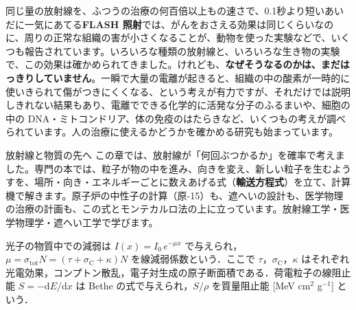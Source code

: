 \begin{phmada}
同じ量の放射線を、ふつうの治療の何百倍以上もの速さで、0.1秒より短いあいだに一気にあてる\textbf{FLASH 照射}では、がんをおさえる効果は同じくらいなのに、周りの正常な組織の害が小さくなることが、動物を使った実験などで、いくつも報告されています。いろいろな種類の放射線と、いろいろな生き物の実験で、この効果は確かめられてきました。けれども、\textbf{なぜそうなるのかは、まだはっきりしていません}。一瞬で大量の電離が起きると、組織の中の酸素が一時的に使いきられて傷がつきにくくなる、という考えが有力ですが、それだけでは説明しきれない結果もあり、電離でできる化学的に活発な分子のふるまいや、細胞の中の DNA・ミトコンドリア、体の免疫のはたらきなど、いくつもの考えが調べられています。人の治療に使えるかどうかを確かめる研究も始まっています。
\end{phmada}

\begin{phsaki}{放射線と物質の先へ}
この章では、放射線が「何回ぶつかるか」を確率で考えました。専門の本では、粒子が物の中を進み、向きを変え、新しい粒子を生むようすを、場所・向き・エネルギーごとに数えあげる式（\textbf{輸送方程式}）を立て、計算機で解きます。原子炉の中性子の計算（原-15）も、遮へいの設計も、医学物理の治療の計画も、この式とモンテカルロ法の上に立っています。放射線工学・医学物理学・遮へい工学で学びます。
\end{phsaki}

\begin{senmonsho}[放射線工学の専門書の書き方]
\begin{bkhonbun}
光子の物質中での減弱は $I(x)=I_0\,e^{-\mu x}$ で与えられ，$\mu=\sigma_{\mathrm{tot}}N=(\tau+\sigma_{\mathrm C}+\kappa)N$ を線減弱係数という．ここで $\tau$，$\sigma_{\mathrm C}$，$\kappa$ はそれぞれ光電効果，コンプトン散乱，電子対生成の原子断面積である．荷電粒子の線阻止能 $S=-\mathrm dE/\mathrm dx$ は Bethe の式で与えられ，$S/\rho$ を質量阻止能 [MeV cm$^2$ g$^{-1}$] という．
\end{bkhonbun}
\end{senmonsho}

